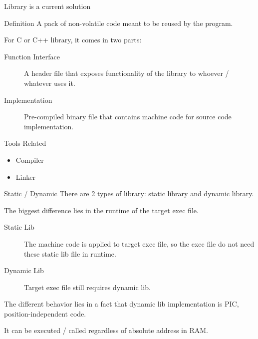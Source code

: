 \begin{frame}{Library is a current solution}
    \begin{block}{Definition}
        A pack of non-volatile code meant to be reused by the program.

        For C or C++ library, it comes in two parts:
        \begin{description}
        \item[Function Interface] A header file that exposes functionality of
            the library to whoever / whatever uses it.
        \item[Implementation] Pre-compiled binary file that contains machine
            code for source code implementation.
        \end{description}
    \end{block}

    \begin{block}{Tools Related}
        \begin{itemize}
        \item {Compiler}
        \item {Linker}
        \end{itemize}
    \end{block}
\end{frame}

\begin{frame}{Static / Dynamic}
    There are 2 types of library: static library and dynamic library.

    The biggest difference lies in the runtime of the target exec file.

    \begin{description}
    \item[Static Lib] The machine code is applied to target exec file, so the
        exec file do not need these static lib file in runtime.
    \item[Dynamic Lib] Target exec file still requires dynamic lib.
    \end{description}

    The different behavior lies in a fact that dynamic lib implementation is
    PIC, position-independent code.

    It can be executed / called regardless of absolute address in RAM.

\end{frame}

